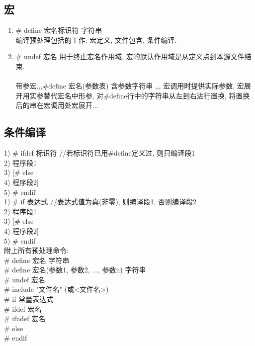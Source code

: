 \documentclass[a4paper,10pt,english]{article}
\begin{document}
\subsection {宏}
\begin{enumerate}
\item{\# define 宏名标识符 字符串} \\
编译预处理包括的工作: 宏定义, 文件包含, 条件编译. 

\item{\# undef 宏名  用于终止宏名作用域, 宏的默认作用域是从定义点到本源文件结束.}\\
\\
带参宏,,,\#define 宏名(参数表) 含参数字符串 ,,, 宏调用时提供实际参数. 宏展开用实参替代宏名中形参, 对\#define行中的字符串从左到右进行置换, 将置换后的串在宏调用处宏展开...
\\
\end{enumerate}

\subsection{条件编译}
1)\hspace{0em} \# ifdef 标识符    //若标识符已用\#define定义过, 则只编译段1 \\
2)\hspace{3em} 程序段1 \\
3)\hspace{0em} [\# else\\
4)\hspace{3em} 程序段2] \\
5)\hspace{0em} \# endif
\\

1)\hspace{0em} \# if 表达式                     //表达式值为真(非零), 则编译段1, 否则编译段2 \\
2)\hspace{3em} 程序段1\\
3)\hspace{0em} [\# else\\
4)\hspace{3em} 程序段2]\\
5)\hspace{0em} \# endif \\
附上所有预处理命令:\\
\# define 宏名 字符串 \\
\# define 宏名(参数1, 参数2, ..., 参数n) 字符串 \\
\# undef 宏名 \\
\# include "文件名" (或<文件名>) \\
\# if 常量表达式 \\
\# ifdef 宏名 \\
\# ifndef 宏名 \\
\# else \\
\# endif \\
\end{document}
